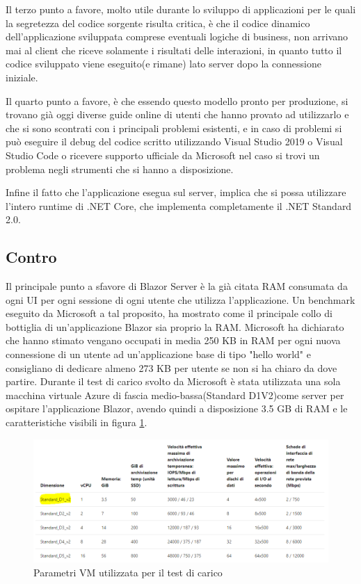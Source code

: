 Il terzo punto a favore, molto utile durante lo sviluppo di applicazioni per le quali la segretezza del codice sorgente risulta critica, \`e che il codice dinamico dell'applicazione sviluppata comprese eventuali logiche di business, non arrivano mai al client che riceve solamente i risultati delle interazioni, in quanto tutto il codice sviluppato viene eseguito(e rimane) lato server dopo la connessione iniziale.

Il quarto punto a favore, \`e che essendo questo modello pronto per produzione, si trovano gi\`a oggi diverse guide online di utenti che hanno provato ad utilizzarlo e che si sono scontrati con i principali problemi esistenti, e in caso di problemi si pu\`o eseguire il debug del codice scritto utilizzando Visual Studio 2019 o Visual Studio Code o ricevere supporto ufficiale da Microsoft nel caso si trovi un problema negli strumenti che si hanno a disposizione.

Infine il fatto che l'applicazione esegua sul server, implica che si possa utilizzare l'intero runtime di .NET Core, che implementa completamente il .NET Standard 2.0.
\subsection{Contro}\label{sez:controBServer}
Il principale punto a sfavore di Blazor Server \`e la gi\`a citata RAM consumata da ogni UI per ogni sessione di ogni utente che utilizza l'applicazione.
Un benchmark eseguito da Microsoft a tal proposito, ha mostrato come il principale collo di bottiglia di un'applicazione Blazor sia proprio la RAM.
Microsoft ha dichiarato che hanno stimato vengano occupati in media 250 KB in RAM per ogni nuova connessione di un utente ad un'applicazione base di tipo "hello world" e consigliano di dedicare almeno 273 KB per utente se non si ha chiaro da dove partire. Durante il test di carico svolto da Microsoft \`e stata utilizzata una sola macchina virtuale Azure di fascia medio-bassa(Standard D1V2)come server per ospitare l'applicazione Blazor, avendo quindi a disposizione 3.5 GB di RAM e le caratteristiche visibili in figura \ref{fig:vmStandardD1V2}.

\begin{figure}[H]
	\centerline{\includegraphics[scale=0.5]{figure/Standard_D1_V2.PNG}}
	\caption{Parametri VM utilizzata per il test di carico}
	\label{fig:vmStandardD1V2}
\end{figure}

